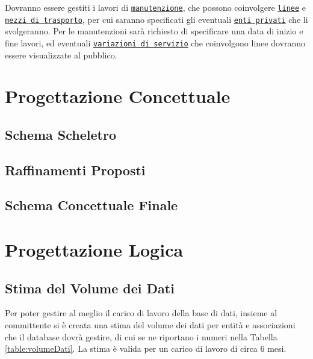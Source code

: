 \documentclass[12pt,a4paper]{report}
\begin{document}
Dovranno essere gestiti i lavori di \underline{\texttt{manutenzione}}, che possono coinvolgere \underline{\texttt{linee}} e \underline{\texttt{mezzi di trasporto}}, per cui saranno specificati gli eventuali \underline{\texttt{enti privati}} che li svolgeranno. Per le manutenzioni sarà richiesto di specificare una data di inizio e fine lavori, ed eventuali \underline{\texttt{variazioni di servizio}} che coinvolgono linee dovranno essere visualizzate al pubblico.

\chapter{Progettazione Concettuale}
\section{Schema Scheletro}
\section{Raffinamenti Proposti}
\section{Schema Concettuale Finale}

\chapter{Progettazione Logica}
\section{Stima del Volume dei Dati}
Per poter gestire al meglio il carico di lavoro della base di dati, insieme al committente si è creata una stima del volume dei dati per entità e associazioni che il database dovrà gestire, di cui se ne riportano i numeri nella Tabella \ref{table:volumeDati}.
La stima è valida per un carico di lavoro di circa 6 mesi.
\end{document}
